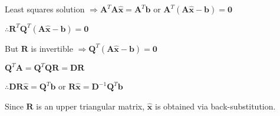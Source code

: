 \documentclass[fleqn]{article}
\begin{document}
	Least squares solution $\Rightarrow \mathbf{A}^T\mathbf{A\hat{x}} = \mathbf{A}^T\mathbf{b}$ or $\mathbf{A}^T(\mathbf{A\hat{x}} - \mathbf{b}) = \mathbf{0}$
	
	$\therefore \mathbf{R}^T\mathbf{Q}^T(\mathbf{A\hat{x}} - \mathbf{b}) = \mathbf{0}$
	
	But $\mathbf{R}$ is invertible $\Rightarrow \mathbf{Q}^T(\mathbf{A\hat{x}} - \mathbf{b}) = \mathbf{0}$
	
	$\mathbf{Q}^T\mathbf{A} = \mathbf{Q}^T\mathbf{QR} = \mathbf{DR}$
	
	$\therefore \mathbf{DR\hat{x}} = \mathbf{Q}^T\mathbf{b}$ or $\mathbf{R\hat{x}} = \mathbf{D}^{-1}\mathbf{Q}^T\mathbf{b}$
	
	Since $\mathbf{R}$ is an upper triangular matrix, $\mathbf{\hat{x}}$ is obtained via back-substitution.
		
\end{document}
